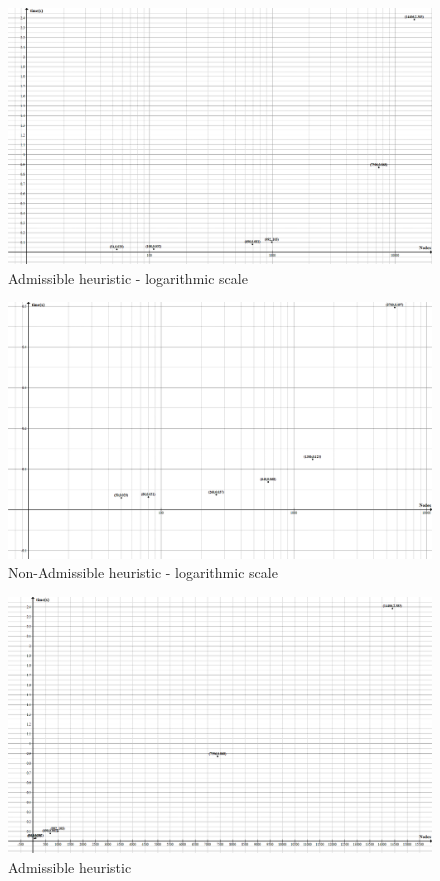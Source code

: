\documentclass[a4paper,9pt]{article}
\begin{document}


\begin{figure}[H]
    \centering
    \includegraphics[width=\textheight,angle=90]{files/Adm.png}
    \caption{Admissible heuristic - logarithmic scale}
    \label{fig:adm}
\end{figure}

\begin{figure}[H]
    \centering
    \includegraphics[width=\textheight,angle=90]{files/NonAdm.png}
    \caption{Non-Admissible heuristic - logarithmic scale}
    \label{fig:nonadm}
\end{figure}

\begin{figure}[H]
    \centering
    \includegraphics[width=\textheight,angle=90]{files/logAdm.png}
    \caption{Admissible heuristic}
    \label{fig:logadm}
\end{figure}
\end{document}
